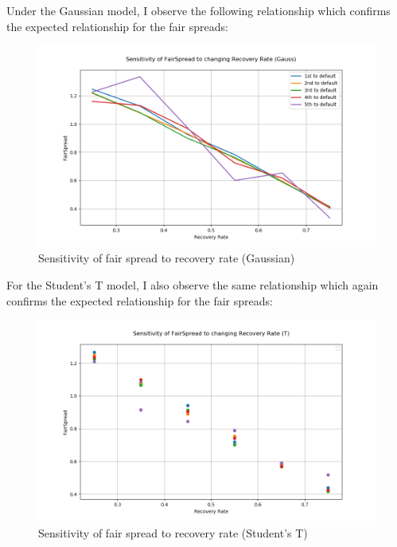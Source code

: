 \documentclass{report}
\theoremstyle{plain}
\theoremstyle{definition}
\begin{document}
Under the Gaussian model, I observe the following relationship which confirms the expected relationship for the fair spreads:

\begin{figure}[H]
	\begin{center}
		\includegraphics[width=15cm]{Sensitivity_of_FairSpread_to_changing_Recovery_Rate_(Gauss).png}
		\caption{Sensitivity of fair spread to recovery rate (Gaussian)} 
		\label{Sensitivity_of_FairSpread_to_changing_Recovery_Rate_(Gauss)}
	\end{center}
\end{figure}

For the Student's T model, I also observe the same relationship which again confirms the expected relationship for the fair spreads: 

\begin{figure}[H]
	\begin{center}
		\includegraphics[width=15cm]{Sensitivity_of_FairSpread_to_changing_Recovery_Rate_(T).png}
		\caption{Sensitivity of fair spread to recovery rate (Student's T)} 
		\label{Sensitivity_of_FairSpread_to_changing_Recovery_Rate_(T)}
	\end{center}
\end{figure}
\end{document}
